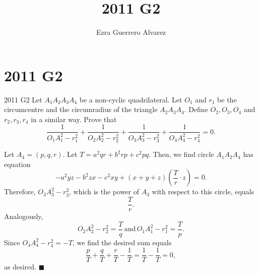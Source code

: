\documentclass[14pt]{article}
\title{2011 G2}
\author{Ezra Guerrero Alvarez}
\begin{document}
\maketitle
	
\section*{2011 G2}

\begin{statement}{2011 G2}
	Let $A_1A_2A_3A_4$ be a non-cyclic quadrilateral. Let $O_1$ and $r_1$ be the circumcentre and the circumradius of the triangle $A_2A_3A_4$. Define $O_2,O_3,O_4$ and $r_2,r_3,r_4$ in a similar way. Prove that
	\[
	\frac{1}{O_1A_1^2-r_1^2}+\frac{1}{O_2A_2^2-r_2^2}+\frac{1}{O_3A_3^2-r_3^2}+\frac{1}{O_4A_4^2-r_4^2}=0.
	\]
\end{statement}
 Let $A_4=(p,q,r)$. Let $T=a^2qr+b^2rp+c^2pq$. Then, we find circle $A_1A_2A_4$ has equation
\[ -a^2yz-b^2zx-c^2xy+(x+y+z)\left(\frac Tr\cdot z\right)=0. \]
Therefore, $O_3A_3^2-r_3^2$, which is the power of $A_3$ with respect to this circle, equals
\[ \frac Tr. \]
Analogously,
\[ O_2A_2^2-r_2^2 = \frac Tq\,\text{and}\, O_1A_1^2-r_1^2 = \frac Tp. \]
Since $O_4A_4^2-r_4^2=-T$, we find the desired sum equals
\[ \frac pT + \frac qT + \frac rT - \frac 1T = \frac 1T - \frac 1T = 0, \]
as desired. $\blacksquare$
	
\end{document}
